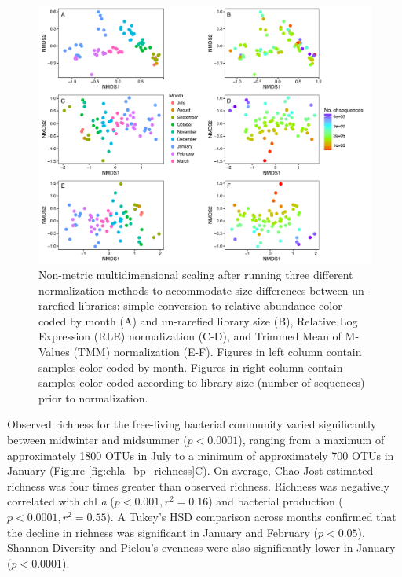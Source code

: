 \begin{figure}[ht!] 
\centering 
\includegraphics[width=\textwidth]{Chapter_3_SWI/Figures/Supplemental_Figure_6_Six_panel_ordination} 
\caption[Non-metric multidimensional scaling based on Bray-Curtis similarity matrices for un-rarefied libraries after three different normalization methods.]{Non-metric multidimensional scaling after running three different
normalization methods to accommodate size differences between un-rarefied libraries: simple conversion to relative abundance color-coded by month (A) and un-rarefied library size (B), Relative Log Expression (RLE) normalization (C-D), and Trimmed Mean of M-Values (TMM) normalization (E-F). Figures in left column contain samples color-coded by month. Figures in right column contain samples color-coded according to library size (number of sequences) prior to normalization.} 
\label{fig:ch2:sixpanord} 
\end{figure}


Observed richness for the free-living bacterial community varied significantly between midwinter and midsummer ($p < 0.0001$), ranging from a maximum of approximately 1800 OTUs in July to a minimum of approximately 700 OTUs in January (Figure \ref{fig:chla_bp_richness}C). On average, Chao-Jost estimated richness was four times greater than observed richness. Richness was negatively correlated with chl \emph{a} ($p<0.001, r^{2} = 0.16$) and bacterial production ($p<0.0001, r^{2} = 0.55$). A Tukey's HSD comparison across months confirmed that the decline in richness was significant in January and February ($p < 0.05$). Shannon Diversity and Pielou's evenness were also significantly lower in January ($p <0.0001$).


